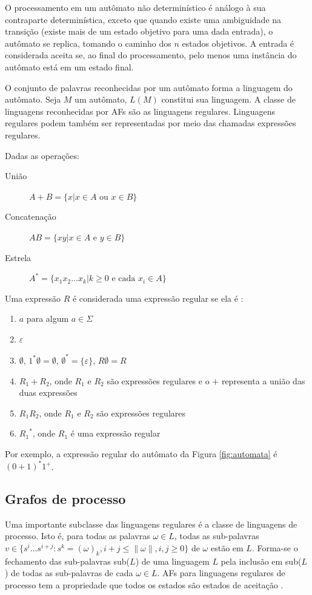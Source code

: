 \documentclass[12pt,a4paper]{article}
\begin{document}
O processamento em um autômato não determinístico é análogo à sua contraparte
determinística, exceto que quando existe uma ambiguidade na transição (existe
mais de um estado objetivo para uma dada entrada), o autômato se replica, tomando
o caminho dos $n$ estados objetivos. A entrada é considerada aceita se, ao
final do processamento, pelo menos uma instância do autômato está em um
estado final.

O conjunto de palavras reconhecidas por um autômato forma a linguagem do
autômato. Seja $M$ um autômato, $L(M)$ constitui sua linguagem. A classe
de linguagens reconhecidas por AFs são as linguagens regulares.
Linguagens regulares podem também ser representadas por meio das chamadas
expressões regulares. 

Dadas as operações:

\begin{description}
\item[União] $A+B=\{x | x \in A \mbox{ ou } x \in B\}$
\item[Concatenação] $AB=\{xy | x \in A \mbox{ e } y \in B\}$
\item[Estrela] $A^*=\{x_1x_2 \ldots x_k | k \ge 0 \mbox{ e cada } x_i \in A\}$
\end{description}

Uma expressão $R$ é considerada uma expressão regular
se ela é :

\begin{enumerate}
\item $a$ para algum $a \in \Sigma$
\item $\varepsilon$
\item $\emptyset$, $1^*\emptyset=\emptyset$, $\emptyset^*=\{\varepsilon\}$, $R\emptyset=R$
\item $R_1+R_2$, onde $R_1$ e $R_2$ são expressões regulares e
o $+$ representa a união das duas expressões
\item $R_1R_2$, onde $R_1$ e $R_2$ são expressões regulares
\item ${R_1}^*$, onde $R_1$ é uma expressão regular
\end{enumerate}

Por exemplo, a expressão regular do autômato da Figura \ref{fig:automata}
é $(0+1)^*1^+$.

\subsection{Grafos de processo}

Uma importante subclasse das linguagens regulares é a classe de linguagens
de processo. Isto é, para todas as palavras $\omega \in L$, todas as
sub-palavras
$v \in \{s^i \ldots s^{i+j}:s^k=(\omega)_k,i+j\le \|\omega\|,i,j\ge 0\}$
de $\omega$ estão em $L$. Forma-se o fechamento das sub-palavras sub($L$)
de uma linguagem $L$ pela inclusão em sub($L$) de todas as sub-palavras
de cada $\omega \in L$. AFs para linguagens regulares de processo tem a
propriedade que todos os estados são estados de aceitação
.
\end{document}
